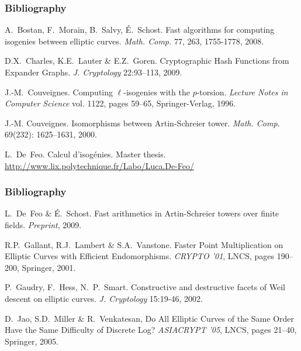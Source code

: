 \documentclass[10pt]{beamer}
\newcommand{\0}{\mathcal{O}}  %
\begin{document}
\begin{frame}
  \frametitle{Bibliography}

  \begin{thebibliography}{1}
    \beamertemplatearticlebibitems
    
   A.~Bostan,
    F.~Morain, B.~Salvy, É.~Schost.  \newblock Fast algorithms for
    computing isogenies between elliptic curves.
    \newblock \emph{Math. Comp.} 77, 263, 1755-1778, 2008.
    
    D.X.~Charles, K.E.~Lauter \& E.Z.~Goren.
    \newblock Cryptographic Hash Functions from Expander Graphs.
    \newblock \emph{J. Cryptology} 22:93--113, 2009.
    
  J.-M.~Couveignes.
    \newblock Computing $\ell$-isogenies with the $p$-torsion.
    \newblock \emph{Lecture Notes in Computer Science} vol. 1122, pages 59--65,
    Springer-Verlag, 1996.
    
   J.-M. Couveignes.
    \newblock Isomorphisms between {A}rtin-{S}chreier tower.
    \newblock \emph{Math. Comp.} 69(232): 1625--1631, 2000.

   L.~De~Feo.  \newblock Calcul d'isogénies.
    \newblock Master
    thesis. \url{http://www.lix.polytechnique.fr/Labo/Luca.De-Feo/}

  \end{thebibliography}
\end{frame}


\begin{frame}
  \frametitle{Bibliography}

  \begin{thebibliography}{1}

   L.~De~Feo \& É.~Schost.  \newblock
    Fast arithmetics in Artin-Schreier towers over finite fields.
    \newblock \emph{Preprint}, 2009.

    R.P.~Gallant, R.J.~Lambert \& S.A.~Vanstone.
    \newblock Faster Point Multiplication on Elliptic Curves
    with Efficient Endomorphisms.
    \newblock \emph{CRYPTO '01}, LNCS, pages 190--200, Springer, 2001.
    
    P.~Gaudry, F.~Hess, N.~P.~Smart.
    \newblock Constructive and destructive facets of Weil
    descent on elliptic curves.
    \newblock \emph{J. Cryptology} 15:19-46, 2002.

    D.~Jao, S.D.~Miller \& R.~Venkatesan,
    \newblock Do All Elliptic Curves of the Same Order Have the Same 
    Difficulty of Discrete Log?
    \newblock \emph{ASIACRYPT '05}, LNCS, pages 21--40, Springer, 2005.

  \end{thebibliography}
\end{frame}
\end{document}
